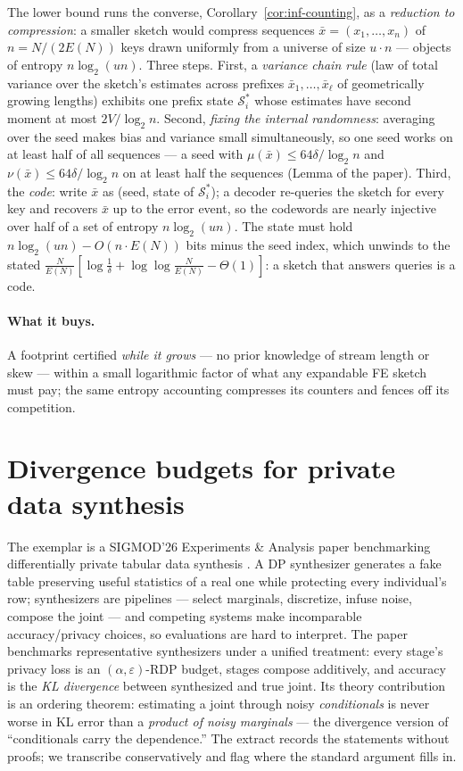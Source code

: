 The lower bound runs the converse, Corollary~\ref{cor:inf-counting}, as a
\emph{reduction to compression}: a smaller sketch would compress sequences $\bar x =
(x_1, \dots, x_n)$ of $n = N/(2E(N))$ keys drawn uniformly from a universe of size
$u \cdot n$ --- objects of entropy $n\log_2(un)$. Three steps. First, a
\emph{variance chain rule} (law of total variance over the sketch's estimates across
prefixes $\bar x_1, \dots, \bar x_\ell$ of geometrically growing lengths) exhibits
one prefix state $\mathcal{S}^*_i$ whose estimates have second moment at most
$2V/\log_2 n$. Second, \emph{fixing the internal randomness}: averaging over the seed
makes bias and variance small simultaneously, so one seed works on at least half of
all sequences --- a seed with $\mu(\bar x) \le 64\delta/\log_2 n$ and $\nu(\bar x)
\le 64\delta/\log_2 n$ on at least half the sequences (Lemma of the paper). Third,
the \emph{code}: write $\bar x$ as (seed, state of $\mathcal{S}^*_i$); a decoder
re-queries the sketch for every key and recovers $\bar x$ up to the error event, so
the codewords are nearly injective over half of a set of entropy $n\log_2(un)$. The
state must hold $n\log_2(un) - O(n \cdot E(N))$ bits minus the seed index, which
unwinds to the stated $\frac{N}{E(N)}[\log \frac1\delta + \log\log \frac{N}{E(N)} -
\Theta(1)]$: a sketch that answers queries is a code.

\paragraph{What it buys.}
A footprint certified \emph{while it grows} --- no prior knowledge of stream length
or skew --- within a small logarithmic factor of what any expandable FE sketch must
pay; the same entropy accounting compresses its counters and fences off its
competition.

\section{Divergence budgets for private data synthesis}
\label{sec:inf-dpsynth}

The exemplar is a SIGMOD'26 Experiments \& Analysis paper benchmarking differentially
private tabular data synthesis \citep{sigmod26-279}. A DP synthesizer generates a fake
table preserving useful statistics of a real one while protecting every individual's
row; synthesizers are pipelines --- select marginals, discretize, infuse noise,
compose the joint --- and competing systems make incomparable accuracy/privacy
choices, so evaluations are hard to interpret. The paper benchmarks representative
synthesizers under a unified treatment: every stage's privacy loss is an
$(\alpha, \varepsilon)$-RDP budget, stages compose additively, and accuracy is the
\emph{KL divergence} between synthesized and true joint. Its theory contribution is
an ordering theorem: estimating a joint through noisy \emph{conditionals} is never
worse in KL error than a \emph{product of noisy marginals} --- the divergence version
of ``conditionals carry the dependence.'' The extract records the statements without
proofs; we transcribe conservatively and flag where the standard argument fills in.

